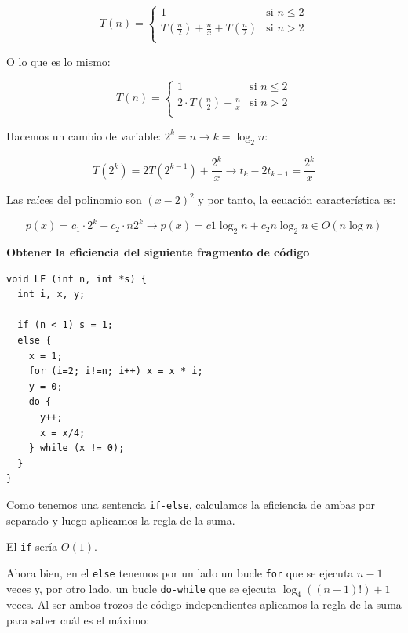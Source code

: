 \documentclass[10pt,a4paper,spanish]{report}
\theoremstyle{definition}
\theoremstyle{remark}
\begin{document}
\begin{displaymath}
T(n) = \left\{ \begin{array}{ll}
1 & \textrm{si $n \le 2$}\\
T(\frac{n}{2}) + \frac{n}{x} + T(\frac{n}{2}) & \textrm{si $n > 2$} \\
\end{array} \right.
\end{displaymath}
\begin{center}
O lo que es lo mismo:
\end{center}
\begin{displaymath}
T(n) = \left\{ \begin{array}{ll}
1 & \textrm{si $n \le 2$}\\
2\cdot T(\frac{n}{2}) + \frac{n}{x} & \textrm{si $n > 2$} \\
\end{array} \right.
\end{displaymath}
\begin{center}
Hacemos un cambio de variable: $2^k = n \rightarrow k = \log_2 n$:
\end{center}
\begin{displaymath}
T(2^k) = 2T(2^{k-1}) + \frac{2^k}{x} \longrightarrow t_k - 2t_{k-1} = \frac{2^k}{x}
\end{displaymath}
\begin{center}
Las raíces del polinomio son $(x-2)^2$ y por tanto, la ecuación característica es:
\end{center}
\begin{displaymath}
p(x) = c_1 \cdot 2^k + c_2 \cdot n 2^k \longrightarrow p(x) = c1 \log_2 n +  c_2 n \log_2 n \in O(n\log n)
\end{displaymath}

\textbf{\textcolor[rgb]{0.1,0.2,1}Obtener la eficiencia del siguiente fragmento de código}

\begin{verbatim}
void LF (int n, int *s) {
  int i, x, y;

  if (n < 1) s = 1;
  else {
    x = 1;
    for (i=2; i!=n; i++) x = x * i;
    y = 0;
    do {
      y++;
      x = x/4;
    } while (x != 0);
  }
}
\end{verbatim}

Como tenemos una sentencia \verb*|if-else|, calculamos la eficiencia de ambas por separado y luego aplicamos la regla de la suma.

El \verb*|if| sería $O(1)$.

Ahora bien, en el \verb*|else| tenemos por un lado un bucle \verb*|for| que se ejecuta $n-1$ veces y, por otro lado, un bucle \verb*|do-while| que se ejecuta $\log_4 ((n-1)!) + 1$ veces. Al ser ambos trozos de código independientes aplicamos la regla de la suma para saber cuál es el máximo:
\end{document}
